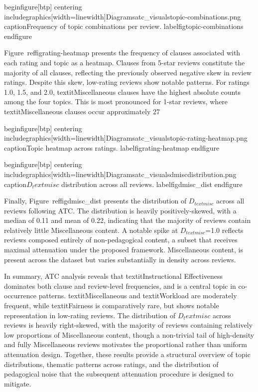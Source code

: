 begin{figure}[btp]  
    centering
    includegraphics[width=linewidth]{Diagramsatc_visualstopic-combinations.png}
    caption{Frequency of topic combinations per review.}
    label{figtopic-combinations}
end{figure}

Figure~ref{figrating-heatmap} presents the frequency of clauses associated with each rating and topic as a heatmap. Clauses from 5-star reviews constitute the majority of all clauses, reflecting the previously observed negative skew in review ratings. Despite this skew, low-rating reviews show notable patterns. For ratings 1.0, 1.5, and 2.0, textit{Miscellaneous} clauses have the highest absolute counts among the four topics. This is most pronounced for 1-star reviews, where textit{Miscellaneous} clauses occur approximately 27%

begin{figure}[btp]  
    centering
    includegraphics[width=linewidth]{Diagramsatc_visualstopic-rating-heatmap.png}
    caption{Topic heatmap across ratings.}
    label{figrating-heatmap}
end{figure}

begin{figure}[btp]  
    centering
    includegraphics[width=linewidth]{Diagramsatc_visualsdmiscdistribution.png}
    caption{$D_text{misc}$ distribution across all reviews.}
    label{figdmisc_dist}
end{figure}

Finally, Figure~ref{figdmisc_dist} presents the distribution of $D_{text{misc}}$ across all 
reviews following ATC. The distribution is heavily positively-skewed, with a median of 0.11 
and mean of 0.22, indicating that the majority of reviews contain relatively little 
Miscellaneous content. A notable spike at $D_{text{misc}}$=1.0 reflects reviews 
composed entirely of non-pedagogical content, a subset that receives maximal attenuation 
under the proposed framework. Miscellaneous content, 
is present across the dataset but varies substantially in density across reviews.

In summary, ATC analysis reveals that textit{Instructional Effectiveness} dominates both clause and review-level frequencies, and is a central topic in co-occurrence patterns. textit{Miscellaneous} and textit{Workload} are moderately frequent, while textit{Fairness} is comparatively rare, but shows notable representation in low-rating reviews. The distribution of $D_text{misc}$ across reviews is heavily right-skewed, with the majority of reviews containing relatively low proportions of Miscellaneous content, though a non-trivial tail of high-density and fully Miscellaneous reviews motivates the proportional rather than uniform attenuation design. Together, these results provide a structural overview of topic distributions, thematic patterns across ratings, and the distribution of pedagogical noise that the subsequent attenuation procedure is designed to mitigate.

